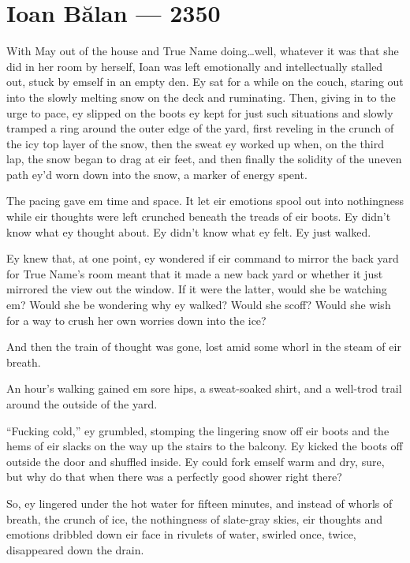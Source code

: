 \hypertarget{ioan-bux103lan-2350}{%
\chapter{Ioan Bălan — 2350}\label{ioan-bux103lan-2350}}

With May out of the house and True Name doing\ldots well, whatever it was that she did in her room by herself, Ioan was left emotionally and intellectually stalled out, stuck by emself in an empty den. Ey sat for a while on the couch, staring out into the slowly melting snow on the deck and ruminating. Then, giving in to the urge to pace, ey slipped on the boots ey kept for just such situations and slowly tramped a ring around the outer edge of the yard, first reveling in the crunch of the icy top layer of the snow, then the sweat ey worked up when, on the third lap, the snow began to drag at eir feet, and then finally the solidity of the uneven path ey'd worn down into the snow, a marker of energy spent.

The pacing gave em time and space. It let eir emotions spool out into nothingness while eir thoughts were left crunched beneath the treads of eir boots. Ey didn't know what ey thought about. Ey didn't know what ey felt. Ey just walked.

Ey knew that, at one point, ey wondered if eir command to mirror the back yard for True Name's room meant that it made a new back yard or whether it just mirrored the view out the window. If it were the latter, would she be watching em? Would she be wondering why ey walked? Would she scoff? Would she wish for a way to crush her own worries down into the ice?

And then the train of thought was gone, lost amid some whorl in the steam of eir breath.

An hour's walking gained em sore hips, a sweat-soaked shirt, and a well-trod trail around the outside of the yard.

``Fucking cold,'' ey grumbled, stomping the lingering snow off eir boots and the hems of eir slacks on the way up the stairs to the balcony. Ey kicked the boots off outside the door and shuffled inside. Ey could fork emself warm and dry, sure, but why do that when there was a perfectly good shower right there?

So, ey lingered under the hot water for fifteen minutes, and instead of whorls of breath, the crunch of ice, the nothingness of slate-gray skies, eir thoughts and emotions dribbled down eir face in rivulets of water, swirled once, twice, disappeared down the drain.

